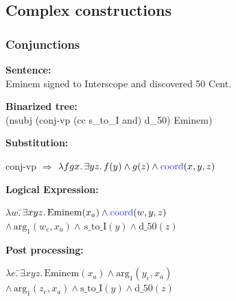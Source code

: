 \documentclass[mathserif,12pt]{beamer}
\newcommand{\hlight}[1]{{\color{blue!80} #1}}
\renewcommand{\land}{\wedge}
\newcommand{\lspace}{.\,}
\begin{document}
\subsection{Complex constructions}

\begin{frame}[noframenumbering]
\frametitle{Conjunctions}

\textbf{Sentence:} \\
{\centering Eminem signed to Interscope and discovered 50 Cent. \\} 

\vspace{0.3cm}  
\textbf{Binarized tree:} \\
{\centering (nsubj (conj-vp (cc s\_to\_I and) d\_50) Eminem) \\}

\pause
\vspace{0.3cm}  
\textbf{Substitution:} 

\begin{tabbing}
  conj-vp $\Rightarrow$ $\lambda f g x \lspace \exists y z \lspace f(y) \land g(z) \land \mathrm{\hlight{coord}}(x, y, z)$
\end{tabbing}

\vspace{0.3cm}  
\textbf{Logical Expression:}
\begin{tabbing}
  $\lambda w \lspace$\=$\exists x y z \lspace \mathrm{Eminem}(x_a) \land \mathrm{\hlight{coord}}(w, y, z)$ \\
\> $\land\, \mathrm{arg_1}(w_e, x_a) \land\, \mathrm{s\_to\_I}(y) \land \mathrm{d\_50}(z)$
\end{tabbing}

\pause
\textbf{Post processing:}
\begin{tabbing}
$\lambda e \lspace$\=$\exists x y z \lspace \mathrm{Eminem}(x_a) \land \mathrm{arg_1}(y_e, x_a)$ \\
\> $\land\,\mathrm{arg_1}(z_e, x_a) \land \mathrm{s\_to\_I}(y) \land \mathrm{d\_50}(z)$
\end{tabbing}
\end{frame}
\end{document}
